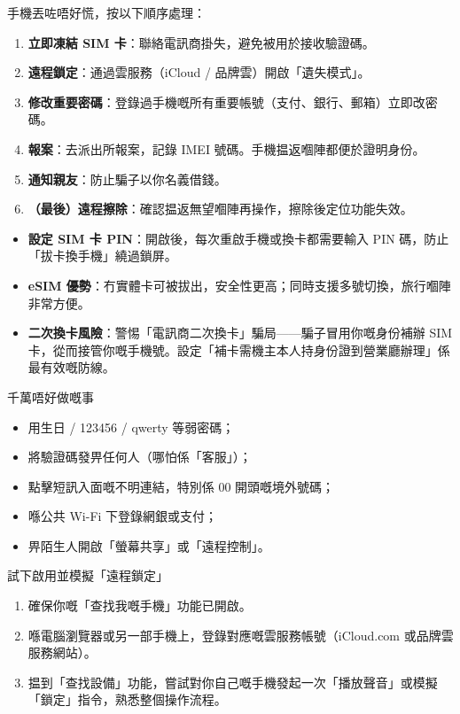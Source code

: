 
手機丟咗唔好慌，按以下順序處理：

\begin{enumerate}
  \item \textbf{立即凍結 SIM 卡}：聯絡電訊商掛失，避免被用於接收驗證碼。
  \item \textbf{遠程鎖定}：通過雲服務（iCloud / 品牌雲）開啟「遺失模式」。
  \item \textbf{修改重要密碼}：登錄過手機嘅所有重要帳號（支付、銀行、郵箱）立即改密碼。
  \item \textbf{報案}：去派出所報案，記錄 IMEI 號碼。手機揾返嗰陣都便於證明身份。
  \item \textbf{通知親友}：防止騙子以你名義借錢。
  \item \textbf{（最後）遠程擦除}：確認揾返無望嗰陣再操作，擦除後定位功能失效。
\end{enumerate}


\begin{itemize}
  \item \textbf{設定 SIM 卡 PIN}：開啟後，每次重啟手機或換卡都需要輸入 PIN 碼，防止「拔卡換手機」繞過鎖屏。
  \item \textbf{eSIM 優勢}：冇實體卡可被拔出，安全性更高；同時支援多號切換，旅行嗰陣非常方便。
  \item \textbf{二次換卡風險}：警惕「電訊商二次換卡」騙局——騙子冒用你嘅身份補辦 SIM 卡，從而接管你嘅手機號。設定「補卡需機主本人持身份證到營業廳辦理」係最有效嘅防線。
\end{itemize}

\begin{tcbwarn}{千萬唔好做嘅事}
\begin{itemize}
  \item 用生日 / 123456 / qwerty 等弱密碼；
  \item 將驗證碼發畀任何人（哪怕係「客服」）；
  \item 點擊短訊入面嘅不明連結，特別係 00 開頭嘅境外號碼；
  \item 喺公共 Wi-Fi 下登錄網銀或支付；
  \item 畀陌生人開啟「螢幕共享」或「遠程控制」。
\end{itemize}

\end{tcbwarn}

\begin{tcbpractice}{試下啟用並模擬「遠程鎖定」}
\begin{enumerate}
  \item 確保你嘅「查找我嘅手機」功能已開啟。
  \item 喺電腦瀏覽器或另一部手機上，登錄對應嘅雲服務帳號（iCloud.com 或品牌雲服務網站）。
  \item 揾到「查找設備」功能，嘗試對你自己嘅手機發起一次「播放聲音」或模擬「鎖定」指令，熟悉整個操作流程。
\end{enumerate}

\end{tcbpractice}
